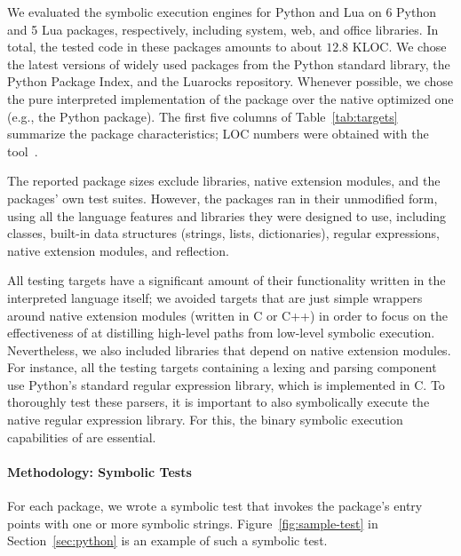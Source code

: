 We evaluated the symbolic execution engines for Python and Lua on 6 Python and 5 Lua packages, respectively, including system, web, and office libraries. In total, the tested code in these packages amounts to about $12.8$ KLOC.  We chose the latest versions of widely used packages from the Python standard library, the Python Package Index, and the Luarocks repository.  Whenever possible, we chose the pure interpreted implementation of the package over the native optimized one (e.g., the Python  package). The first five columns of Table~\ref{tab:targets} summarize the package characteristics; LOC numbers were obtained with the  tool~\cite{cloc}.

The reported package sizes exclude libraries, native extension modules, and the packages' own test suites.
However, the packages ran in their unmodified form, using all the language features and libraries they were designed to use, including classes, built-in data structures (strings, lists, dictionaries), regular expressions, native extension modules, and reflection.  

All testing targets have a significant amount of their functionality written in the interpreted language itself; we avoided targets that are just simple wrappers around native extension modules (written in C or C++) in order to focus on the effectiveness of \chef at distilling high-level paths from low-level symbolic execution.  Nevertheless, we also included libraries that depend on native extension modules.  For instance, all the testing targets containing a lexing and parsing component use Python's standard regular expression library, which is implemented in C.
To thoroughly test these parsers, it is important to also symbolically execute the native regular expression library. For this, the binary symbolic execution capabilities of \chef are essential.

\paragraph{Methodology: Symbolic Tests}

For each package, we wrote a symbolic test that invokes the package's entry points with one or more symbolic strings.  
Figure~\ref{fig:sample-test} in Section~\ref{sec:python} is an example of such a symbolic test.

